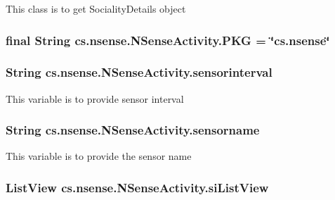 This class is to get Sociality\-Details object \hypertarget{classcs_1_1nsense_1_1_n_sense_activity_a26d527c7425b807ab6eda661541fac0d}{
\subsubsection[{P\-K\-G}]{\setlength{\rightskip}{0pt plus 5cm}final String cs.\-nsense.\-N\-Sense\-Activity.\-P\-K\-G = \char`\"{}cs.\-nsense\char`\"{}\hspace{0.3cm}{\ttfamily [static]}}}\label{classcs_1_1nsense_1_1_n_sense_activity_a26d527c7425b807ab6eda661541fac0d}
\hypertarget{classcs_1_1nsense_1_1_n_sense_activity_a72e35d65f34da9bd3a1b34ad3208c0b6}{
\subsubsection[{sensorinterval}]{\setlength{\rightskip}{0pt plus 5cm}String cs.\-nsense.\-N\-Sense\-Activity.\-sensorinterval\hspace{0.3cm}{\ttfamily [private]}}}\label{classcs_1_1nsense_1_1_n_sense_activity_a72e35d65f34da9bd3a1b34ad3208c0b6}
This variable is to provide sensor interval \hypertarget{classcs_1_1nsense_1_1_n_sense_activity_a634d40b37a27c90ebeac668d4cc3a809}{
\subsubsection[{sensorname}]{\setlength{\rightskip}{0pt plus 5cm}String cs.\-nsense.\-N\-Sense\-Activity.\-sensorname\hspace{0.3cm}{\ttfamily [private]}}}\label{classcs_1_1nsense_1_1_n_sense_activity_a634d40b37a27c90ebeac668d4cc3a809}
This variable is to provide the sensor name \hypertarget{classcs_1_1nsense_1_1_n_sense_activity_aca33368b7b96f27d8ca7a445264bdca9}{
\subsubsection[{si\-List\-View}]{\setlength{\rightskip}{0pt plus 5cm}List\-View cs.\-nsense.\-N\-Sense\-Activity.\-si\-List\-View\hspace{0.3cm}{\ttfamily [private]}}}\label{classcs_1_1nsense_1_1_n_sense_activity_aca33368b7b96f27d8ca7a445264bdca9}
